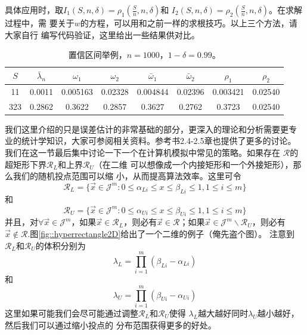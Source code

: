 具体应用时，取$I_1(S, n, \delta) = \rho_1(\frac{S}{n}, n, \delta)$和
$I_2(S, n, \delta) = \rho_2(\frac{S}{n}, n, \delta)$。在求解过程中，需
要关于$w$的方程，可以用和之前一样的求根技巧。以上三个方法，请大家自行
编写代码验证，这里给出一些结果供对比。

\begin{table}[!ht]
   \centering
   \caption{置信区间举例，$n = 1000$，$1 - \delta = 0.99$。}
   \label{table::confidence_intervals_2}
\begin{tabular}{|c|c|c|c|c|c|c|c|}
 \hline
 $S$ & $\bar{\lambda}_n$ & $\omega_1$ & $\omega_2$&
 $\bar{\omega}_1$&$\bar{\omega}_2$&
 $\rho_1$&$\rho_2$\\
 \hline
 11&0.0011&0.005163&0.02328&0.004844&0.02396&0.003421&0.02540\\
 \hline
 323&0.2862&0.3622&0.2857&0.3627&0.2762&0.3723&0.02540\\
 \hline
\end{tabular}
\end{table}

我们这里介绍的只是误差估计的非常基础的部分，更深入的理论和分析需要更专
业的统计学知识，大家可参阅相关资料。参考书2.4-2.5章也提供了更多的讨论。
我们在这一节最后集中讨论一下一个在计算机模拟中常见的策略。如果存在
$\mathscr{R}$的超矩形下界$\mathscr{R}_L$和上界$\mathscr{R}_U$（在二维
  可以想像成一个内接矩形和一个外接矩形），那么我们的随机投点范围可以缩
小，从而提高算法效率。这里可令
\begin{equation}
  \mathscr{R}_{L} = \{\vec{x} \in \mathscr{J}^m : 0 \leq \alpha_{Li} \leq x
  \leq \beta_{Li} \leq 1, 1 \leq i \leq m\}
\end{equation}
和
\begin{equation}
  \mathscr{R}_{U} = \{\vec{x} \in \mathscr{J}^m : 0 \leq \alpha_{Ui} \leq x
  \leq \beta_{Ui} \leq 1, 1 \leq i \leq m\}
\end{equation}
并且，对$\forall \vec{x} \in \mathscr{J}^m$，如果$\vec{x} \in
\mathscr{R}_L$，则必有$\vec{x} \in \mathscr{R}$；如果$\vec{x} \in
\mathscr{J}^m \backslash \mathscr{R}_U$，则必有$\vec{x} \notin
\mathscr{R}$.图\ref{fig::hyperrectangle2D}给出了一个二维的例子（俺先盗个图）。
注意到$\mathscr{R}_L$和$\mathscr{R}_U$的体积分别为
\begin{equation}
  \lambda_L = \prod_{i = 1}^m(\beta_{Li} - \alpha_{Li})
  \label{eq::area_lower}
\end{equation}
和
\begin{equation}
  \lambda_U = \prod_{i = 1}^m(\beta_{Ui} - \alpha_{Ui})
  \label{eq::area_upper}
\end{equation}
这里如果可能我们会尽可能通过调整$\mathscr{R}_L$和$\mathscr{R}_U$使得
$\lambda_L$越大越好同时$\lambda_U$越小越好，然后我们可以通过缩小投点的
分布范围获得更多的好处。

